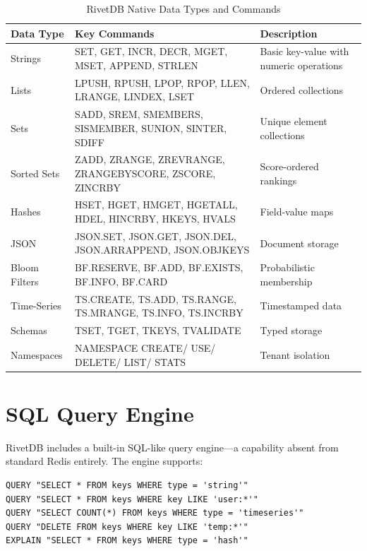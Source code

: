 \documentclass[12pt,a4paper]{report}
\begin{document}
\begin{table}[htbp]
\caption{RivetDB Native Data Types and Commands}
\label{tab:datatypes}
\centering
\small
\begin{tabular}{@{}p{2.5cm}p{4cm}p{5cm}@{}}
\toprule
\textbf{Data Type} & \textbf{Key Commands} & \textbf{Description} \\
\midrule
Strings & SET, GET, INCR, DECR, MGET, MSET, APPEND, STRLEN & Basic key-value with numeric operations \\
\midrule
Lists & LPUSH, RPUSH, LPOP, RPOP, LLEN, LRANGE, LINDEX, LSET & Ordered collections \\
\midrule
Sets & SADD, SREM, SMEMBERS, SISMEMBER, SUNION, SINTER, SDIFF & Unique element collections \\
\midrule
Sorted Sets & ZADD, ZRANGE, ZREVRANGE, ZRANGEBYSCORE, ZSCORE, ZINCRBY & Score-ordered rankings \\
\midrule
Hashes & HSET, HGET, HMGET, HGETALL, HDEL, HINCRBY, HKEYS, HVALS & Field-value maps \\
\midrule
JSON & JSON.SET, JSON.GET, JSON.DEL, JSON.ARRAPPEND, JSON.OBJKEYS & Document storage \\
\midrule
Bloom Filters & BF.RESERVE, BF.ADD, BF.EXISTS, BF.INFO, BF.CARD & Probabilistic membership \\
\midrule
Time-Series & TS.CREATE, TS.ADD, TS.RANGE, TS.MRANGE, TS.INFO, TS.INCRBY & Timestamped data \\
\midrule
Schemas & TSET, TGET, TKEYS, TVALIDATE & Typed storage \\
\midrule
Namespaces & NAMESPACE CREATE/ USE/ DELETE/ LIST/ STATS & Tenant isolation \\
\bottomrule
\end{tabular}
\end{table}

\section{SQL Query Engine}

RivetDB includes a built-in SQL-like query engine---a capability absent from standard Redis entirely. The engine supports:

\begin{lstlisting}
QUERY "SELECT * FROM keys WHERE type = 'string'"
QUERY "SELECT * FROM keys WHERE key LIKE 'user:*'"
QUERY "SELECT COUNT(*) FROM keys WHERE type = 'timeseries'"
QUERY "DELETE FROM keys WHERE key LIKE 'temp:*'"
EXPLAIN "SELECT * FROM keys WHERE type = 'hash'"
\end{lstlisting}
\end{document}
